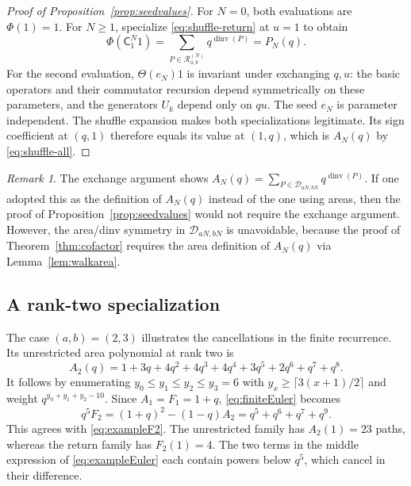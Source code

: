 \documentclass[12pt,reqno]{amsart}
\numberwithin{equation}{section}
\theoremstyle{definition}
\theoremstyle{remark}
\newtheorem*{remark}{Remark}
\theoremstyle{plain}
\DeclareMathOperator{\dinv}{dinv}
\newcommand{\Cop}{\mathsf C}
\newcommand{\Rpaths}{\mathcal R_{a,b}^{(N)}}
\begin{document}
\begin{proof}[Proof of Proposition~\ref{prop:seedvalues}]
For $N=0$, both evaluations are $\Phi(1)=1$.
For $N\ge1$, specialize \eqref{eq:shuffle-return} at $u=1$ to obtain
\[
 \Phi(\Cop_1^N1)=\sum_{P\in\Rpaths}q^{\dinv(P)}=P_N(q).
\]
For the second evaluation, $\Theta(e_N)1$ is invariant under
exchanging $q,u$: the basic operators and their commutator recursion
depend symmetrically on these parameters, and the generators $U_k$
depend only on $qu$.  The seed $e_N$ is parameter independent.
The shuffle expansion makes both specializations legitimate.
Its sign coefficient at $(q,1)$ therefore equals its value at $(1,q)$,
which is $A_N(q)$ by \eqref{eq:shuffle-all}.
\end{proof}

\begin{remark}
The exchange argument shows $A_N(q)=\sum_{P\in\mathcal D_{aN,bN}}q^{\dinv(P)}$. If one adopted this as the definition of $A_N(q)$ instead of the one using areas, then the proof of Proposition~\ref{prop:seedvalues} would not require the exchange argument. However, the area/dinv symmetry in $\mathcal D_{aN,bN}$ is unavoidable, because the proof of Theorem~\ref{thm:cofactor} requires the area definition of $A_N(q)$ via Lemma~\ref{lem:walkarea}.
\end{remark}

\subsection{A rank-two specialization}\label{subsec:runningrecurrence}
The case $(a,b)=(2,3)$ illustrates the cancellations in the finite
recurrence.  Its unrestricted area polynomial at rank two is
\begin{equation}\label{eq:exampleA2}
 A_2(q)=1+3q+4q^2+4q^3+4q^4+3q^5+2q^6+q^7+q^8.
\end{equation}
It follows by enumerating
$y_0\le y_1\le y_2\le y_3=6$ with
$y_x\ge\lceil3(x+1)/2\rceil$ and weight $q^{y_0+y_1+y_2-10}$.
Since $A_1=F_1=1+q$, \eqref{eq:finiteEuler} becomes
\begin{equation}\label{eq:exampleEuler}
 q^5F_2=(1+q)^2-(1-q)A_2=q^5+q^6+q^7+q^9.
\end{equation}
This agrees with \eqref{eq:exampleF2}.
The unrestricted family has $A_2(1)=23$ paths, whereas the return
family has $F_2(1)=4$.  The two terms in the middle expression of \eqref{eq:exampleEuler} each contain powers below $q^5$, which cancel in their difference. 
\end{document}
